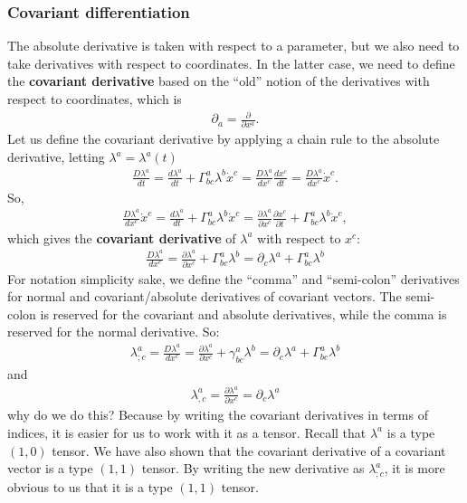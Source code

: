\documentclass{article}
\theoremstyle{definition}
\begin{document}
\subsubsection{Covariant differentiation}
The absolute derivative is taken with respect to a parameter, but we also need to take derivatives with respect to coordinates. In the latter case, we need to define the \textbf{covariant derivative} based on the ``old'' notion of the derivatives with respect to coordinates, which is
\begin{align*}
\partial_{a} = \frac{\partial }{\partial x^a}.
\end{align*}
Let us define the covariant derivative by applying a chain rule to the absolute derivative, letting $\lambda^a = \lambda^a(t)$
\begin{align*}
\frac{D\lambda^a}{dt} = \frac{d\lambda^a}{dt} + \Gamma^a_{bc}\lambda^b\dot{x}^c = \frac{D\lambda^a}{dx^c}\frac{dx^c}{dt} = \frac{D\lambda^a}{dx^c}\dot{x}^c.
\end{align*}So,
\begin{align*}
\frac{D\lambda^a}{dx^c}\dot{x}^c = \frac{d\lambda^a}{dt} + \Gamma^a_{bc}\lambda^b\dot{x}^c = \frac{\partial \lambda^a}{\partial x^c}\frac{\partial x^c}{\partial t} + \Gamma^a_{bc}\lambda^b\dot{x}^c, 
\end{align*}
which gives the \textbf{covariant derivative} of $\lambda^a$ with respect to $x^c$:
\begin{align*}
\boxed{\frac{D\lambda^a}{dx^c} = \frac{\partial \lambda^a}{\partial x^c} + \Gamma^a_{bc}\lambda^b = \partial_c\lambda^a + \Gamma^a_{bc}\lambda^b}
\end{align*}
For notation simplicity sake, we define the ``comma'' and ``semi-colon'' derivatives for normal and covariant/absolute derivatives of covariant vectors. The semi-colon is reserved for the covariant and absolute derivatives, while the comma is reserved for the normal derivative. So:
\begin{align*}
\boxed{\lambda^a_{;c} = \frac{D\lambda^a}{dx^c} = \frac{\partial \lambda^a}{\partial x^c} + \gamma^a_{bc}\lambda^b = \partial_c\lambda^a + \Gamma^a_{bc}\lambda^b}
\end{align*}
and
\begin{align*}
\boxed{\lambda^a_{,c} = \frac{\partial \lambda^a}{\partial x^c} = \partial_c\lambda^a}
\end{align*}
why do we do this? Because by writing the covariant derivatives in terms of indices, it is easier for us to work with it as a tensor. Recall that $\lambda^a$ is a type $(1,0)$ tensor. We have also shown that the covariant derivative of a covariant vector is a type $(1,1)$ tensor. By writing the new derivative as $\lambda^a_{;c}$, it is more obvious to us that it is a type $(1,1)$ tensor.\\
\end{document}
